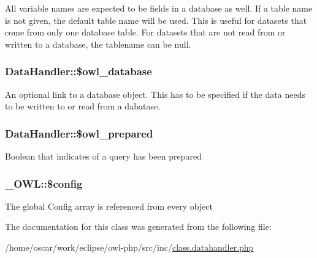 All variable names are expected to be fields in a database as well. If a table name is not given, the default table name will be used. This is useful for datasets that come from only one database table. For datasets that are not read from or written to a database, the tablename can be null. \hypertarget{classDataHandler_3ac49aa018e0ebe4c74f5a636d455a8b}{
\subsubsection{\setlength{\rightskip}{0pt plus 5cm}DataHandler::\$owl\_\-database}}
\label{classDataHandler_3ac49aa018e0ebe4c74f5a636d455a8b}


An optional link to a database object. This has to be specified if the data needs to be written to or read from a dabatase. \hypertarget{classDataHandler_e6093d21291ed3ab3183e11962452928}{
\subsubsection{\setlength{\rightskip}{0pt plus 5cm}DataHandler::\$owl\_\-prepared}}
\label{classDataHandler_e6093d21291ed3ab3183e11962452928}


Boolean that indicates of a query has been prepared \hypertarget{class__OWL_f37a011667dda12fc417a68a6f3077d1}{
\subsubsection{\setlength{\rightskip}{0pt plus 5cm}\_\-OWL::\$config}}
\label{class__OWL_f37a011667dda12fc417a68a6f3077d1}


The global Config array is referenced from every object 

The documentation for this class was generated from the following file:\begin{CompactItemize}
\item 
/home/oscar/work/eclipse/owl-php/src/inc/\hyperlink{class_8datahandler_8php}{class.datahandler.php}\end{CompactItemize}
